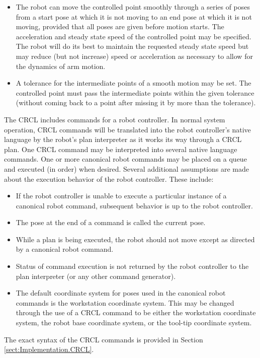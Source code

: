 \begin{itemize}
\item The robot can move the controlled point smoothly through a series of
poses from a start pose at which it is not moving to an end pose at
which it is not moving, provided that all poses are given before
motion starts. The acceleration and steady state speed of the
controlled point may be specified. The robot will do its best to
maintain the requested steady state speed but may reduce (but not
increase) speed or acceleration as necessary to allow for the dynamics
of arm motion.

\item A tolerance for the intermediate points of a smooth motion may be set.
The controlled point must pass the intermediate points within the
given tolerance (without coming back to a point after missing it by
more than the tolerance).
\end{itemize}

The CRCL includes commands for a robot controller. In normal system operation,
CRCL commands will be translated into the robot controller's native
language by the robot's plan interpreter as it works its way through a
CRCL plan. One CRCL command may be interpreted into several native
language commands.
One or more canonical robot commands may be placed on a queue and
executed (in order) when desired. Several additional assumptions are
made about the execution behavior of the robot controller. These include:

\begin{itemize}
\item If the robot controller is unable to execute a particular instance of a
canonical robot command, subsequent behavior is up to the robot
controller.

\item The pose at the end of a command is called the current pose.

\item While a plan is being executed, the robot should not move except as
directed by a canonical robot command.

\item Status of command execution is not returned by the robot controller to
the plan interpreter (or any other command generator).

\item The default coordinate system for poses used in the canonical robot commands is
the workstation coordinate system. This may be changed through the use of
a CRCL command to be either the workstation coordinate system, the
robot base coordinate system, or the tool-tip coordinate system.
\end{itemize}

The exact syntax of the CRCL commands is provided in Section \ref{sect:Implementation.CRCL}.
